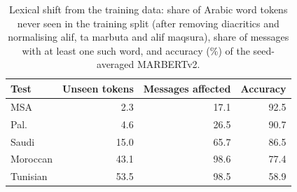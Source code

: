 \begin{table}[t]\centering\small\caption{Lexical shift from the training data: share of Arabic word tokens never seen in the training split (after removing diacritics and normalising alif, ta marbuta and alif maqsura), share of messages with at least one such word, and accuracy (\%) of the seed-averaged MARBERTv2.}\label{tab:lex}
\begin{tabular}{lrrr}\toprule
Test & Unseen tokens & Messages affected & Accuracy \\\midrule
MSA & 2.3 & 17.1 & 92.5 \\
Pal. & 4.6 & 26.5 & 90.7 \\
Saudi & 15.0 & 65.7 & 86.5 \\
Moroccan & 43.1 & 98.6 & 77.4 \\
Tunisian & 53.5 & 98.5 & 58.9 \\
\bottomrule\end{tabular}\end{table}
